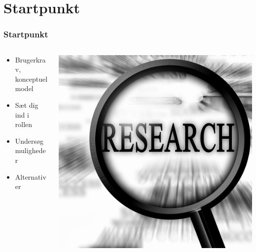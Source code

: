 \documentclass{beamer}
\begin{document}
\section{Startpunkt}
\begin{frame}
  \frametitle{Startpunkt}
  \begin{columns}[T]
    \begin{column}{0.5\textwidth}
      \begin{itemize}
	    \item Brugerkrav, konceptuel model
	    \item Sæt dig ind i rollen
	    \item Undersøg muligheder
	    \item Alternativer
      \end{itemize}  
    \end{column}
    \begin{column}{.5\textwidth}
      \includegraphics[width=\textwidth]{research.jpg}
    \end{column}
  \end{columns}
\end{frame}
\end{document}
